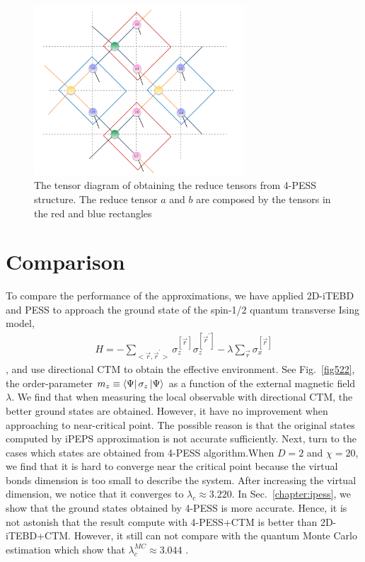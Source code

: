 \begin{figure}[ht]
	\centering
	\includegraphics[width=0.70\textwidth]{figures/fig521.png}
	\caption[The tensor diagram of obtaining the reduce tensors from 4-PESS structure.]{The tensor diagram of obtaining the reduce tensors from 4-PESS structure. The reduce tensor $a$ and $b$ are composed by the tensors in the red and blue rectangles}
	\label{fig521}
\end{figure}

\section{Comparison}

To compare the performance of the approximations, we have applied 2D-iTEBD and PESS to approach the ground state of the spin-1/2 quantum transverse Ising model, 
\begin{align}
	H = -\sum_{<\vec{r},\vec{r}^{\prime}>}{\sigma_z^{[ \vec{r}^{} ]} \sigma_z^{[ \vec{r}^{\prime} ]}} - \lambda \sum_{\vec{r}}{\sigma_x^{[ \vec{r} ]}}
\end{align}
, and use directional CTM to obtain the effective environment. See Fig.~\ref{fig522}, the order-parameter $m_z \equiv  \Bra{\Psi} \sigma_z \Ket{\Psi}$ as a function of the external magnetic field $\lambda$. We find that when measuring the local observable with directional CTM, the better ground states are obtained. However, it have no improvement when approaching to near-critical point. The possible reason is that 
the original states computed by iPEPS approximation is not accurate sufficiently. Next, turn to the cases which states are obtained from 4-PESS algorithm.When $D=2$ and $\chi = 20$, we find that it is hard to converge near the critical point because the virtual bonds dimension is too small to describe the system. After increasing the virtual dimension, we notice that it converges to $\lambda_c \approx 3.220$. In Sec.~\ref{chapter:ipess}, we show that the ground states obtained by 4-PESS is more accurate. Hence, it is not astonish that the result compute with 4-PESS+CTM is better than 2D-iTEBD+CTM. However, it still can not compare with the quantum Monte Carlo estimation which show that $\lambda^{MC}_c \approx 3.044$ \cite{PhysRevE.66.066110}.

